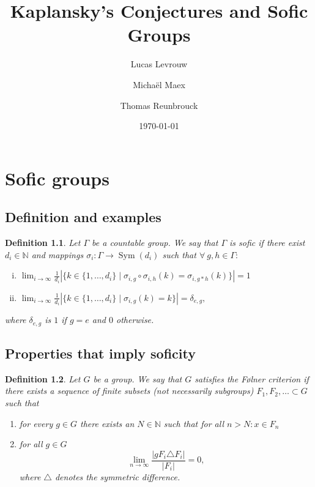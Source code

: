 \documentclass[a4paper]{report}
\author{Lucas Levrouw \and Michaël Maex \and Thomas Reunbrouck}
\title{Kaplansky's Conjectures and Sofic Groups}
\date{\today}
\newcommand{\N}{\mathbb{N}}
\newcommand{\card}[1]{\left| #1 \right|}
\DeclareMathOperator{\sym}{Sym}
\newtheorem{definition}{Definition}
\begin{document}
    \maketitle
    \chapter{Sofic groups}

\section{Definition and examples}

    \begin{definition}\label{def:Sophic}
        Let $\Gamma$ be a countable group. We say that $\Gamma$ is sofic if there exist $d_i \in \N$ and mappings $\sigma_i : \Gamma \to \sym(d_i)$ such that $\forall\ g, h \in \Gamma:$
        \begin{enumerate}[(i)]
            \item $\displaystyle \lim_{i\to \infty} \frac{1}{d_i} \card{\big\{k \in \{1, \dots, d_i\} \mid \sigma_{i,g} \circ \sigma_{i,h}(k) = \sigma_{i, g*h} (k) \big\}} = 1$
            \item $\displaystyle \lim_{i\to \infty} \frac{1}{d_i}  \card{\big\{k \in \{1, \dots, d_i\} \mid \sigma_{i,g}(k) = k \big\}} = \delta_{e,g},$
        \end{enumerate}
        where $\delta_{e,g}$ is $1$ if $g = e$ and $0$ otherwise.
    \end{definition}





    \section{Properties that imply soficity}

    \begin{definition}\cite{noauthor_folner_2019} \label{def:folner}
        Let $G$ be a group. We say that $G$ satisfies the Følner criterion if there exists a sequence of finite subsets (not necessarily subgroups) $F_1, F_2, \dots \subset G$ such that 
        \begin{enumerate}
            \item for every $g \in G$ there exists an $N \in \N$ such that for all $n > N: x \in F_n$
            \item for all $g \in G$ 
            $$\lim_{n\to \infty} \frac{\card{gF_i \triangle F_i}}{\card{F_i}} = 0, $$
            where $\triangle$ denotes the symmetric difference.
        \end{enumerate}
    \end{definition}
\end{document}
